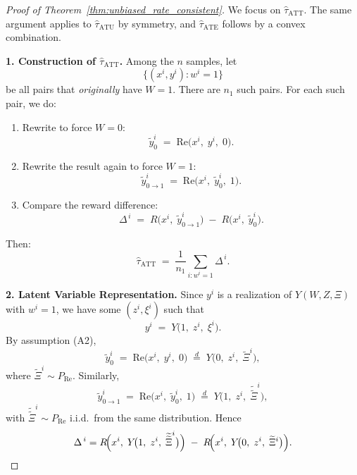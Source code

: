 \documentclass{article}
\theoremstyle{definition}
\begin{document}
    \begin{proof}[Proof of Theorem~\ref{thm:unbiased_rate_consistent}]
    We focus on \(\hat{\tau}_{\text{ATT}}\).  The same argument applies to \(\hat{\tau}_{\text{ATU}}\) by symmetry, and \(\hat{\tau}_{\text{ATE}}\) follows by a convex combination.
    
    \bigskip
    \textbf{1. Construction of \(\hat{\tau}_{\text{ATT}}\).}
    Among the \(n\) samples, let
    \[
    \{(x^i, y^i): w^i = 1\}
    \]
    be all pairs that \emph{originally} have \(W=1\).  There are \(n_1\) such pairs.  For each such pair, we do:
    \begin{enumerate}
    \item Rewrite to force \(W=0\):
    \[
    \tilde{y}^{i}_{0} 
    \;=\; 
    \text{Re}\!\bigl(x^i,\;y^i,\;0\bigr).
    \]
    \item Rewrite the result again to force \(W=1\):
    \[
    \tilde{y}^{i}_{0\to1}
    \;=\;
    \text{Re}\!\bigl(x^i,\;\tilde{y}^{i}_{0},\;1\bigr).
    \]
    \item Compare the reward difference:
    \[
    \Delta^{\,i}
    \;=\;
    R\bigl(x^i,\;\tilde{y}^{i}_{0\to1}\bigr)
    \;-\;
    R\bigl(x^i,\;\tilde{y}^{i}_{0}\bigr).
    \]
    \end{enumerate}
    Then:
    \[
    \hat{\tau}_{\text{ATT}}
    \;=\;
    \frac{1}{n_1}\sum_{i: w^i=1} 
    \Delta^{\,i}.
    \]
    
    \bigskip
    \textbf{2. Latent Variable Representation.}
    Since \(y^i\) is a realization of \(Y(W,Z,\Xi)\) with \(w^i=1\), we have some \((z^i,\xi^i)\) such that
    \[
    y^i
    \;=\;
    Y\!\bigl(1,\;z^i,\;\xi^i\bigr).
    \]
    By assumption (A2),
    \[
    \tilde{y}^{i}_{0}
    \;=\;
    \text{Re}\!\bigl(x^i,\;y^i,\;0\bigr)
    \;\stackrel{d}{=}\;
    Y\bigl(0,\;z^i,\;\widetilde{\Xi}^i\bigr),
    \]
    where \(\widetilde{\Xi}^i \sim P_{\mathrm{Re}}\).  Similarly,
    \[
    \tilde{y}^{i}_{0\to1}
    \;=\;
    \text{Re}\!\bigl(x^i,\;\tilde{y}^{i}_{0},\;1\bigr)
    \;\stackrel{d}{=}\;
    Y\bigl(1,\;z^i,\;\widetilde{\widetilde{\Xi}}^i\bigr),
    \]
    with \(\widetilde{\widetilde{\Xi}}^i\sim P_{\mathrm{Re}}\) i.i.d.\ from the same distribution.  Hence
    \[
    \Delta^{\,i}
    =
    R\!\Bigl(x^i,\;Y\!\bigl(1,\;z^i,\;\widetilde{\widetilde{\Xi}}^i\bigr)\Bigr)
    \;-\;
    R\!\Bigl(x^i,\;Y\!\bigl(0,\;z^i,\;\widetilde{\Xi}^i\bigr)\Bigr).
    \]
    

\end{proof}
\end{document}
